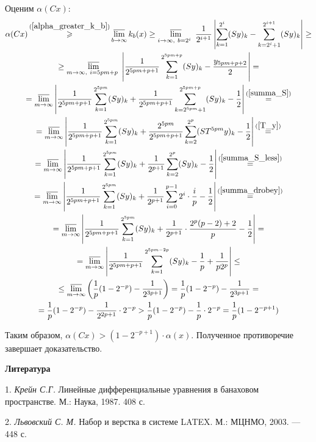 \documentclass[a5paper,12pt,openbib]{report}
\begin{document}
Оценим $\alpha(Cx)$:
\begin{multline*}
	\alpha (Cx) \mathop{\geqslant}^{(\ref{alpha_greater_k_b})}
	\varlimsup_{b\to \infty} k_b(x) \geq
	\varlimsup_{
		i\to \infty,~
		b=2^i~
	}\frac{1}{2^{i+1}}\left|
		\sum_{k=1}^{2^i}(Sy)_k - \sum_{k=2^i+1}^{2^{i+1}}(Sy)_k
	\right| \geq
	\\ \geq
	\varlimsup_{
		m\to \infty,~
		i=5pm+p~
	}\left|
		\frac{1}{2^{5pm+p+1}}\sum_{k=1}^{2^{5pm+p}}(Sy)_k - \frac{y_{5pm+p+2}}{2}
	\right| =
	\\=
	\varlimsup_{m\to \infty}\left|
		\frac{1}{2^{5pm+p+1}}\sum_{k=1}^{2^{5pm}}(Sy)_k
		+
		\frac{1}{2^{5pm+p+1}}\sum_{k=2^{5pm}+1}^{2^{5pm+p}}(Sy)_k
		- \frac{1}{2}
	\right|
	\mathop{=}^{(\ref{summa_S})}
	\\=
	\varlimsup_{m\to \infty}\left|
		\frac{1}{2^{5pm+p+1}}\sum_{k=1}^{2^{5pm}}(Sy)_k
		+
		\frac{2^{5pm}}{2^{5pm+p+1}} \sum_{k=2}^{2^p}(ST^{5pm}y)_k
		- \frac{1}{2}
	\right|
	\mathop{=}^{(\ref{T_y})}
	\\=
	\varlimsup_{m\to \infty}\left|
		\frac{1}{2^{5pm+p+1}}\sum_{k=1}^{2^{5pm}}(Sy)_k
		+
		\frac{1}{2^{p+1}} \sum_{k=2}^{2^p}(Sy)_k
		- \frac{1}{2}
	\right|
	\mathop{=}^{(\ref{summa_S_less})}
	\\=
	\varlimsup_{m\to \infty}\left|
		\frac{1}{2^{5pm+p+1}}\sum_{k=1}^{2^{5pm}}(Sy)_k
		+
		\frac{1}{2^{p+1}} \sum_{i=0}^{p-1}2^i \cdot \frac{i}{p}
		- \frac{1}{2}
	\right|
	\mathop{=}^{(\ref{summa_drobey})}
	\\=
	\varlimsup_{m\to \infty}\left|
		\frac{1}{2^{5pm+p+1}}\sum_{k=1}^{2^{5pm}}(Sy)_k
		+
		\frac{1}{2^{p+1}} \cdot \frac{2^p(p-2)+2}{p}
		- \frac{1}{2}
	\right| =
	\\=
	\varlimsup_{m\to \infty}\left|
		\frac{1}{2^{5pm+p+1}}\sum_{k=1}^{2^{5pm-2p}}(Sy)_k
		-\frac{1}{p} + \frac{1}{p 2^p}
	\right| \leq
	\\ \leq
	\varlimsup_{m\to \infty} \left(
		\frac{1}{p} (1-2^{-p})
		- \frac{1}{2^{3p+1}}
	\right) =
	\frac{1}{p} (1-2^{-p})
	- \frac{1}{2^{3p+1}}
	= \\ =
	\frac{1}{p} (1-2^{-p})
	- \frac{1}{2^{2p+1}} \cdot 2^{-p}
	>
	\frac{1}{p} (1-2^{-p})
	- \frac{1}{p} \cdot 2^{-p}
	=
	\frac{1}{p} (1-2^{-p+1})
\end{multline*}


Таким образом,
$
	\alpha(Cx) >  
	(1-2^{-p+1}) \cdot \alpha(x)
$.
Полученное противоречие завершает доказательство.


\smallskip \centerline{\bf Литература}\nopagebreak

1. {\it Крейн С.Г.} Линейные дифференциальные уравнения в банаховом пространстве. М.: Наука, 1987. 408 с.

2. {\it Львовский С. М.} Набор и верстка в системе LATEX. М.: МЦНМО, 2003. — 448 с.
\end{document}
